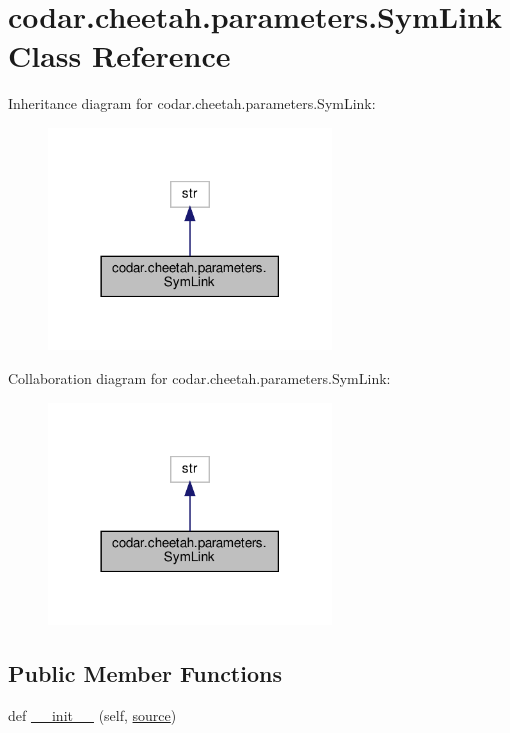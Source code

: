 \hypertarget{classcodar_1_1cheetah_1_1parameters_1_1_sym_link}{}\section{codar.\+cheetah.\+parameters.\+Sym\+Link Class Reference}
\label{classcodar_1_1cheetah_1_1parameters_1_1_sym_link}


Inheritance diagram for codar.\+cheetah.\+parameters.\+Sym\+Link\+:
\nopagebreak
\begin{figure}[H]
\begin{center}
\leavevmode
\includegraphics[width=213pt]{classcodar_1_1cheetah_1_1parameters_1_1_sym_link__inherit__graph}
\end{center}
\end{figure}


Collaboration diagram for codar.\+cheetah.\+parameters.\+Sym\+Link\+:
\nopagebreak
\begin{figure}[H]
\begin{center}
\leavevmode
\includegraphics[width=213pt]{classcodar_1_1cheetah_1_1parameters_1_1_sym_link__coll__graph}
\end{center}
\end{figure}
\subsection*{Public Member Functions}
\begin{DoxyCompactItemize}
\item 
def \hyperlink{classcodar_1_1cheetah_1_1parameters_1_1_sym_link_a5be8b2828b71e39b667a275b1668bc58}{\+\_\+\+\_\+init\+\_\+\+\_\+} (self, \hyperlink{classcodar_1_1cheetah_1_1parameters_1_1_sym_link_a44311787db039f8d36a5f649f2aaba5e}{source})
\end{DoxyCompactItemize}
